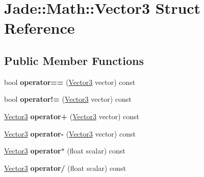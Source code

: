 \hypertarget{struct_jade_1_1_math_1_1_vector3}{}\section{Jade\+:\+:Math\+:\+:Vector3 Struct Reference}
\label{struct_jade_1_1_math_1_1_vector3}
\subsection*{Public Member Functions}
\begin{DoxyCompactItemize}
\item 
\hypertarget{struct_jade_1_1_math_1_1_vector3_a63e0f3bba35a37c3e3c551d8f3c855dd}{}bool {\bfseries operator==} (\hyperlink{struct_jade_1_1_math_1_1_vector3}{Vector3} vector) const \label{struct_jade_1_1_math_1_1_vector3_a63e0f3bba35a37c3e3c551d8f3c855dd}

\item 
\hypertarget{struct_jade_1_1_math_1_1_vector3_a9eef48f68a136c5778d1adf7d4cbee3f}{}bool {\bfseries operator!=} (\hyperlink{struct_jade_1_1_math_1_1_vector3}{Vector3} vector) const \label{struct_jade_1_1_math_1_1_vector3_a9eef48f68a136c5778d1adf7d4cbee3f}

\item 
\hypertarget{struct_jade_1_1_math_1_1_vector3_a52267470a1ecec61f21bf65908ac9531}{}\hyperlink{struct_jade_1_1_math_1_1_vector3}{Vector3} {\bfseries operator+} (\hyperlink{struct_jade_1_1_math_1_1_vector3}{Vector3} vector) const \label{struct_jade_1_1_math_1_1_vector3_a52267470a1ecec61f21bf65908ac9531}

\item 
\hypertarget{struct_jade_1_1_math_1_1_vector3_a61d8011114aca01c5d6b1f1095d1c46f}{}\hyperlink{struct_jade_1_1_math_1_1_vector3}{Vector3} {\bfseries operator-\/} (\hyperlink{struct_jade_1_1_math_1_1_vector3}{Vector3} vector) const \label{struct_jade_1_1_math_1_1_vector3_a61d8011114aca01c5d6b1f1095d1c46f}

\item 
\hypertarget{struct_jade_1_1_math_1_1_vector3_acbda6ff13e942bc727136c3aec4c65eb}{}\hyperlink{struct_jade_1_1_math_1_1_vector3}{Vector3} {\bfseries operator$\ast$} (float scalar) const \label{struct_jade_1_1_math_1_1_vector3_acbda6ff13e942bc727136c3aec4c65eb}

\item 
\hypertarget{struct_jade_1_1_math_1_1_vector3_a1b088a2fe7999d8fa39a1bfc283a3342}{}\hyperlink{struct_jade_1_1_math_1_1_vector3}{Vector3} {\bfseries operator/} (float scalar) const \label{struct_jade_1_1_math_1_1_vector3_a1b088a2fe7999d8fa39a1bfc283a3342}


\end{DoxyCompactItemize}
